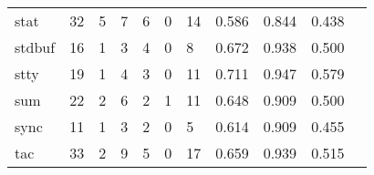 \begin{longtable}{lp{1.2cm}p{1.2cm}p{1.2cm}p{1.2cm}p{1.2cm}p{1.2cm}p{1.2cm}p{1.2cm}p{1.2cm}p{1.2cm}}
stat      &                                    32 &                                                  5 &                                                  7 &                                                  6 &                                                  0 &                                                 14 &                                         0.586 &                                              0.844 &                                              0.438 \\
stdbuf    &                                    16 &                                                  1 &                                                  3 &                                                  4 &                                                  0 &                                                  8 &                                         0.672 &                                              0.938 &                                              0.500 \\
stty      &                                    19 &                                                  1 &                                                  4 &                                                  3 &                                                  0 &                                                 11 &                                         0.711 &                                              0.947 &                                              0.579 \\
sum       &                                    22 &                                                  2 &                                                  6 &                                                  2 &                                                  1 &                                                 11 &                                         0.648 &                                              0.909 &                                              0.500 \\
sync      &                                    11 &                                                  1 &                                                  3 &                                                  2 &                                                  0 &                                                  5 &                                         0.614 &                                              0.909 &                                              0.455 \\
tac       &                                    33 &                                                  2 &                                                  9 &                                                  5 &                                                  0 &                                                 17 &                                         0.659 &                                              0.939 &                                              0.515 \\

\end{longtable}
